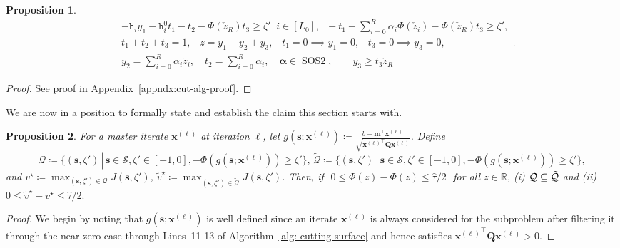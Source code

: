 \documentclass[opre,sglanonrev]{informs4}
\newtheorem{proposition}{Proposition}
\newcommand{\mS}{\mathcal{S}}
\newcommand{\mQ}{\mathcal Q}
\newcommand{\mbR}{\mathbb R}
\newcommand{\zz}{\check{z}}
\newcommand{\bmean}{\bm{m}}
\newcommand{\bs}{\bm{s}}
\newcommand{\bx}{\bm{x}}
\newcommand{\bQ}{\bm Q}
\begin{document}
{\begin{proposition}
\begin{subequations}
\begin{equation}
{		}
		{
			\begin{aligned}
				&  - \mathtt{h}_i y_1 - \mathtt{h}_i^0 t_1 -t_2 - \Phi(\zz_{R})t_3 \geq \zeta' \;\; i \in [L_0], \;\; - t_1 -\sum_{i=0}^{R} \alpha_{i} \Phi(\zz_{i})  - \Phi(\zz_{R})t_3\geq \zeta', \\
				& t_1 + t_2 + t_3 = 1, \;\;\; z = y_1 + y_2 + y_3, \;\;\;  t_1 = 0 \implies y_1 = 0, \;\;\; t_3 = 0 \implies y_3 = 0,  \\
				& y_2 = \sum_{i=0}^{R} \alpha_{i} \zz_{i}, \quad t_2 = \sum_{i=0}^{R} \alpha_{i}, \quad \bm{\alpha} \in \mathop{\mathrm{SOS2}}, \qquad y_3 \geq t_3 \zz_{R}
			\end{aligned}
		}.
	\end{equation}
\end{subequations}
\end{proposition}
\vspace{-1.25em}
\begin{proof}
    See proof in Appendix~\ref{appndx:cut-alg-proof}.
\end{proof}
We are now in a position to formally state and establish the claim this section starts with.
\begin{proposition}\label{prop: feasibility-tau}
For a master iterate $\bx^{(\ell)}$ at iteration $\ell$, let $g(\bs;\bx^{(\ell)}) \coloneqq \frac{b-\bmean^\top \bx^{(\ell)}}{\sqrt{{\bx^{(\ell)}}^\top \bQ \bx^{(\ell)}}}$. Define
\[
\mQ \coloneqq \{(\bs,\zeta') \,|\, \bs\in\mS, \zeta'\in[-1,0], -\Phi\!(g(\bs;\bx^{(\ell)}))\ge \zeta' \}, \, \tilde{\mQ} \coloneqq \{(\bs,\zeta') \,|\, \bs\in\mS, \zeta'\in[-1,0],-\underline{\Phi}\!(g(\bs;\bx^{(\ell)}))\ge \zeta' \},
\]
and  $v^\star \coloneqq\max_{(\bs,\zeta')\in\mQ} J(\bs,\zeta')$, $\tilde v^\star \coloneqq \max_{(\bs,\zeta')\in\tilde{\mQ}} J(\bs,\zeta')$.  Then, if $ \,\, 0 \le \Phi(z)-\underline{\Phi}(z) \le \hat{\tau}/2 \,\,$ for all $z\in\mbR$,   (i) $\mQ \subseteq \Tilde{\mQ}$ and (ii) $0 \le \tilde v^\star - v^\star \le \hat\tau/2.$
\end{proposition}

\begin{proof}
   We begin by noting that $g(\bs; \bx^{(\ell)})$ is well defined since an iterate $\bx^{(\ell)}$ is always considered for the subproblem after filtering it through the near-zero case through Lines~11-13 of Algorithm~\ref{alg: cutting-surface} and hence satisfies ${\bx^{(\ell)}}^\top \bQ \bx^{(\ell)} > 0$.
   

\end{proof}}
\end{document}
